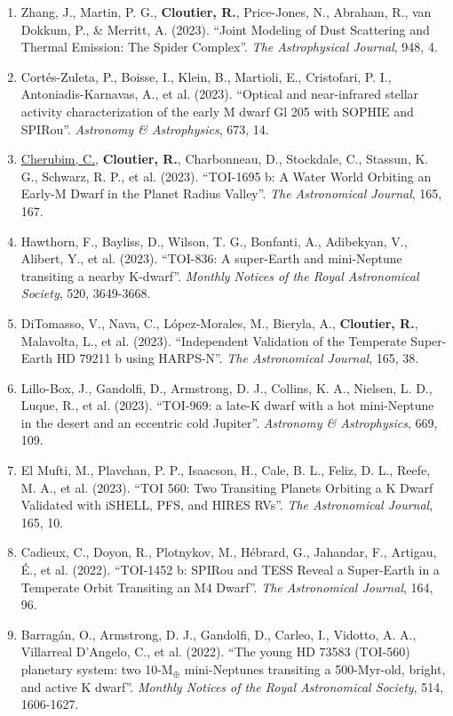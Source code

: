 \documentclass[12pt]{article}
\begin{document}
\begin{itemize}
\begin{enumerate}
\item Zhang, J., Martin, P. G., {\bf Cloutier, R.}, Price-Jones, N., Abraham, R., van Dokkum, P., \& Merritt, A. (2023). ``Joint Modeling of Dust Scattering and Thermal Emission: The Spider Complex''. {\it The Astrophysical Journal}, 948, 4.
\item Cortés-Zuleta, P., Boisse, I., Klein, B., Martioli, E., Cristofari, P. I., Antoniadis-Karnavas, A., et al. (2023). ``Optical and near-infrared stellar activity characterization of the early M dwarf Gl 205 with SOPHIE and SPIRou''. {\it Astronomy \& Astrophysics}, 673, 14.
\item \underline{Cherubim, C.}, {\bf Cloutier, R.}, Charbonneau, D., Stockdale, C., Stassun, K. G., Schwarz, R. P., et al. (2023). ``TOI-1695 b: A Water World Orbiting an Early-M Dwarf in the Planet Radius Valley''. {\it The Astronomical Journal}, 165, 167.
\item Hawthorn, F., Bayliss, D., Wilson, T. G., Bonfanti, A., Adibekyan, V., Alibert, Y., et al. (2023). ``TOI-836: A super-Earth and mini-Neptune transiting a nearby K-dwarf''. {\it Monthly Notices of the Royal Astronomical Society}, 520, 3649-3668.
\item DiTomasso, V., Nava, C., López-Morales, M., Bieryla, A., {\bf Cloutier, R.}, Malavolta, L., et al. (2023). ``Independent Validation of the Temperate Super-Earth HD 79211 b using HARPS-N''. {\it The Astronomical Journal}, 165, 38.
\item Lillo-Box, J., Gandolfi, D., Armstrong, D. J., Collins, K. A., Nielsen, L. D., Luque, R., et al. (2023). ``TOI-969: a late-K dwarf with a hot mini-Neptune in the desert and an eccentric cold Jupiter''. {\it Astronomy \& Astrophysics}, 669, 109.
\item El Mufti, M., Plavchan, P. P., Isaacson, H., Cale, B. L., Feliz, D. L., Reefe, M. A., et al. (2023). ``TOI 560: Two Transiting Planets Orbiting a K Dwarf Validated with iSHELL, PFS, and HIRES RVs''. {\it The Astronomical Journal}, 165, 10.
\item Cadieux, C., Doyon, R., Plotnykov, M., Hébrard, G., Jahandar, F., Artigau, É., et al. (2022). ``TOI-1452 b: SPIRou and TESS Reveal a Super-Earth in a Temperate Orbit Transiting an M4 Dwarf''. {\it The Astronomical Journal}, 164, 96.
\item Barragán, O., Armstrong, D. J., Gandolfi, D., Carleo, I., Vidotto, A. A., Villarreal D’Angelo, C., et al. (2022). ``The young HD 73583 (TOI-560) planetary system: two 10-M$_{\oplus}$ mini-Neptunes transiting a 500-Myr-old, bright, and active K dwarf''. {\it Monthly Notices of the Royal Astronomical Society}, 514, 1606-1627.

\end{enumerate}
\end{itemize}
\end{document}
